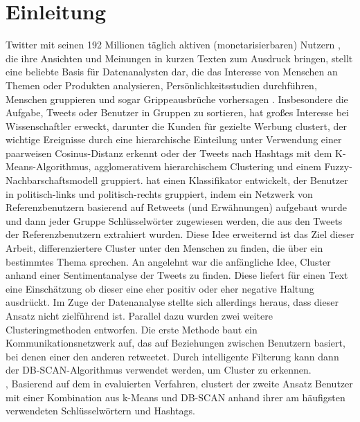 \chapter{Einleitung}
\label{chap:einleitung}
Twitter mit seinen 192 Millionen täglich aktiven (monetarisierbaren) Nutzern \cite{twitter-mdau}, die ihre Ansichten und Meinungen in kurzen Texten zum Ausdruck bringen, stellt eine beliebte Basis für Datenanalysten dar, die das Interesse von Menschen an Themen oder Produkten analysieren, Persönlichkeitsstudien durchführen, Menschen gruppieren und sogar Grippeausbrüche vorhersagen \cite{Achrekar2011}.
Insbesondere die Aufgabe, Tweets oder Benutzer in Gruppen zu sortieren, hat großes Interesse bei Wissenschaftler erweckt, darunter \cite{Friedemann2015C} die Kunden für gezielte Werbung  clustert, \cite{Ifrim2014}  der wichtige Ereignisse durch eine hierarchische Einteilung unter Verwendung einer paarweisen Cosinus-Distanz erkennt oder \cite{Miyamoto2021} der Tweets nach Hashtags mit dem K-Means-Algorithmus, agglomerativem hierarchischem Clustering und einem Fuzzy-Nachbarschaftsmodell gruppiert.
\cite{Conover2011-2} hat einen Klassifikator entwickelt, der Benutzer in politisch-links und politisch-rechts gruppiert, indem ein Netzwerk von Referenzbenutzern basierend auf Retweets (und Erwähnungen) aufgebaut wurde und dann jeder Gruppe Schlüsselwörter zugewiesen werden, die aus den Tweets der Referenzbenutzern extrahiert wurden.
Diese Idee erweiternd ist das Ziel dieser Arbeit, differenziertere Cluster unter den Menschen zu finden, die über ein bestimmtes Thema sprechen.
An \cite{Kharde2016} angelehnt war die anfängliche Idee, Cluster anhand einer Sentimentanalyse der Tweets zu finden. Diese liefert für einen Text eine Einschätzung ob dieser eine eher positiv oder eher negative Haltung ausdrückt.
Im Zuge der Datenanalyse stellte sich allerdings heraus, dass dieser Ansatz nicht zielführend ist.
Parallel dazu wurden zwei weitere Clusteringmethoden entworfen. 
Die erste Methode baut ein Kommunikationsnetzwerk auf, das auf Beziehungen zwischen Benutzern basiert, bei denen einer den anderen retweetet. Durch intelligente Filterung kann dann der DB-SCAN-Algorithmus verwendet werden, um Cluster zu erkennen.\\‚
Basierend auf dem in \cite{Godfrey2014} evaluierten Verfahren, clustert der zweite Ansatz Benutzer mit einer Kombination aus k-Means und DB-SCAN anhand ihrer am häufigsten verwendeten Schlüsselwörtern und Hashtags.\\

